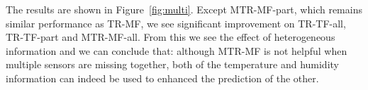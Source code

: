 The results are shown in Figure~\ref{fig:multi}.
Except MTR-MF-part, which remains similar performance as TR-MF, we see significant improvement on TR-TF-all, TR-TF-part and MTR-MF-all. 
From this we see the effect of heterogeneous information and we can conclude that:
although MTR-MF is not helpful when multiple sensors are missing together,
both of the temperature and humidity information can indeed be used to enhanced the prediction of the other.
%
% 

